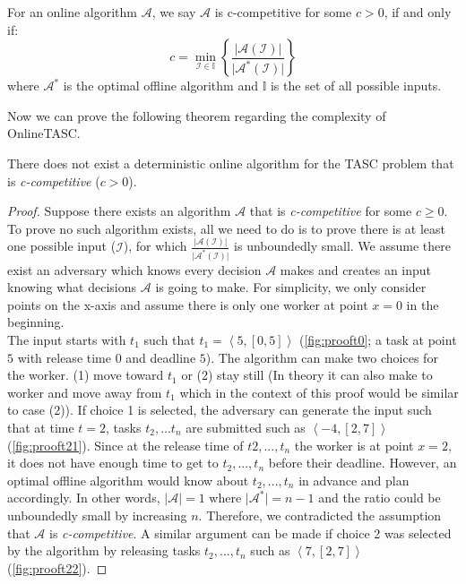 \begin{definition} 
For an online algorithm $\mathcal{A}$, we say $\mathcal{A}$ is c-competitive for some $c > 0$, if and only if:
\begin{equation*}
c = \min\limits_{\mathcal{I} \in \mathbb{I}} \left\lbrace \frac{\vert \mathcal{A}\left( \mathcal{I} \right) \vert}{\vert \mathcal{A}^{*} \left( \mathcal{I} \right) \vert} \right\rbrace
\end{equation*}
where $\mathcal{A}^{*}$ is the optimal offline algorithm and $\mathbb{I}$ is the set of all possible inputs.
\end{definition}

Now we can prove the following theorem regarding the complexity of OnlineTASC.

\begin{theorem}
\label{th:comp_ratio}
There does not exist a deterministic online algorithm for the TASC problem that is \textit{c-competitive} ($c > 0$). 
\end{theorem}

\begin{proof}
Suppose there exists an algorithm $\mathcal{A}$ that is \textit{c-competitive} for some $c \geq 0$. To prove no such algorithm exists, all we need to do is to prove there is at least one possible input ($\mathcal{I}$), for which $\frac{\vert \mathcal{A}(\mathcal{I}) \vert}{\vert \mathcal{A}^{*}(\mathcal{I}) \vert}$ is unboundedly small. We assume there exist an adversary which knows every decision $\mathcal{A}$ makes and creates an input knowing what decisions $\mathcal{A}$ is going to make. For simplicity, we only consider points on the x-axis and assume there is only one worker at point $x=0$ in the beginning.\\
The input starts with $t_1$ such that $t_1 = \left\langle 5, \left[0, 5 \right] \right\rangle$ (\cref{fig:prooft0}; a task at point $5$ with release time $0$ and deadline $5$). The algorithm can make two choices for the worker. (1) move toward $t_1$ or (2) stay still (In theory it can also make to worker  and move away from $t_1$ which in the context of this proof would be similar to case (2)). If choice 1 is selected, the adversary can generate the input such that at time $t = 2$, tasks $t_2, ... t_n$ are submitted such as $\left\langle -4, \left[2, 7 \right] \right\rangle$ (\cref{fig:prooft21}). Since at the release time of $t2, ..., t_n$ the worker is at point $x=2$, it does not have enough time to get to $t_2, ..., t_n$ before their deadline. However, an optimal offline algorithm would know about $t_2, ..., t_n$ in advance and plan accordingly. In other words, $\vert \mathcal{A} \vert = 1$ where $\vert \mathcal{A}^{*} \vert = n - 1$ and the ratio could be unboundedly small by increasing $n$. Therefore, we contradicted the assumption that $\mathcal{A}$ is \textit{c-competitive}. A similar argument can be made if choice 2 was selected by the algorithm by releasing tasks $t_2, ...,t_n$ such as $\left\langle 7, \left[2, 7 \right] \right\rangle$ (\cref{fig:prooft22}).
\end{proof}

